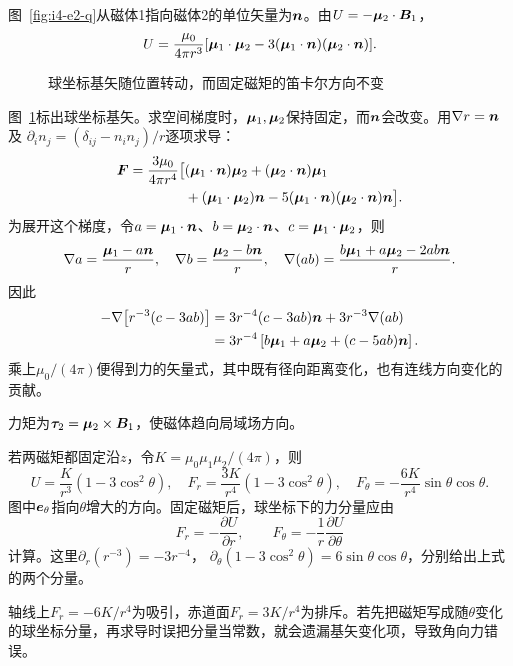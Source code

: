 \begin{solution}
图~\ref{fig:i4-e2-q}从磁体1指向磁体2的单位矢量为$\bm{n}$。由$U=-\bm{\mu}_2\cdot\bm{B}_1$，
\[
U=\frac{\mu_0}{4\pi r^3}
[\bm{\mu}_1\cdot\bm{\mu}_2-3(\bm{\mu}_1\cdot\bm{n})(\bm{\mu}_2\cdot\bm{n})].
\]

\begin{figure}[H]\centering
{}
\caption{球坐标基矢随位置转动，而固定磁矩的笛卡尔方向不变}\label{fig:i4-e2-s}
\end{figure}

图~\ref{fig:i4-e2-s}标出球坐标基矢。求空间梯度时，$\bm{\mu}_1,\bm{\mu}_2$保持固定，而$\bm{n}$会改变。用$\nabla r=\bm{n}$及
$\partial_i n_j=(\delta_{ij}-n_in_j)/r$逐项求导：
\[
\begin{split}
\bm{F}=\frac{3\mu_0}{4\pi r^4}\big[
&(\bm{\mu}_1\cdot\bm{n})\bm{\mu}_2+
(\bm{\mu}_2\cdot\bm{n})\bm{\mu}_1\\
&+(\bm{\mu}_1\cdot\bm{\mu}_2)\bm{n}
-5(\bm{\mu}_1\cdot\bm{n})(\bm{\mu}_2\cdot\bm{n})\bm{n}\big].
\end{split}
\]
为展开这个梯度，令$a=\bm{\mu}_1\cdot\bm{n}$、$b=\bm{\mu}_2\cdot\bm{n}$、$c=\bm{\mu}_1\cdot\bm{\mu}_2$，则
\[
\nabla a=\frac{\bm{\mu}_1-a\bm{n}}{r},\quad
\nabla b=\frac{\bm{\mu}_2-b\bm{n}}{r},\quad
\nabla(ab)=\frac{b\bm{\mu}_1+a\bm{\mu}_2-2ab\bm{n}}{r}.
\]
因此
\[
\begin{split}
-\nabla\!\left[r^{-3}(c-3ab)\right]
&=3r^{-4}(c-3ab)\bm{n}+3r^{-3}\nabla(ab)\\
&=3r^{-4}\left[b\bm{\mu}_1+a\bm{\mu}_2+(c-5ab)\bm{n}\right].
\end{split}
\]
乘上$\mu_0/(4\pi)$便得到力的矢量式，其中既有径向距离变化，也有连线方向变化的贡献。

力矩为$\bm{\tau}_2=\bm{\mu}_2\times\bm{B}_1$，使磁体趋向局域场方向。

若两磁矩都固定沿$z$，令$K=\mu_0\mu_1\mu_2/(4\pi)$，则
\[
U=\frac K{r^3}(1-3\cos^2\theta),\quad
F_r=\frac{3K}{r^4}(1-3\cos^2\theta),\quad
F_\theta=-\frac{6K}{r^4}\sin\theta\cos\theta.
\]
图中$\bm{e}_\theta$指向$\theta$增大的方向。固定磁矩后，球坐标下的力分量应由
\[
F_r=-\frac{\partial U}{\partial r},\qquad
F_\theta=-\frac1r\frac{\partial U}{\partial\theta}
\]
计算。这里$\partial_r(r^{-3})=-3r^{-4}$，
$\partial_\theta(1-3\cos^2\theta)=6\sin\theta\cos\theta$，分别给出上式的两个分量。

轴线上$F_r=-6K/r^4$为吸引，赤道面$F_r=3K/r^4$为排斥。若先把磁矩写成随$\theta$变化的球坐标分量，再求导时误把分量当常数，就会遗漏基矢变化项，导致角向力错误。
\end{solution}

